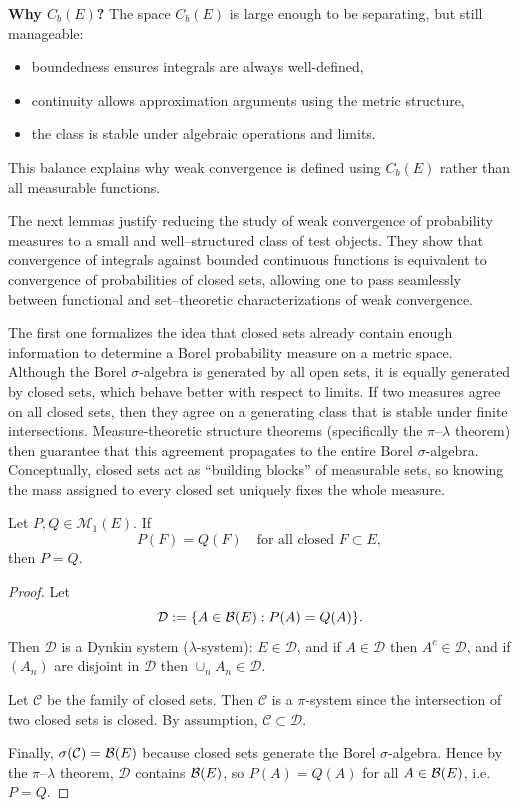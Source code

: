 \medskip

\noindent
\textbf{Why $C_b(E)$?}
The space $C_b(E)$ is large enough to be separating, but still manageable:
\begin{itemize}
\item boundedness ensures integrals are always well-defined,
\item continuity allows approximation arguments using the metric structure,
\item the class is stable under algebraic operations and limits.
\end{itemize}
This balance explains why weak convergence is defined using $C_b(E)$
rather than all measurable functions.

The next lemmas justify reducing the study of weak convergence of probability measures to a
small and well--structured class of test objects. They show that convergence of integrals
against bounded continuous functions is equivalent to convergence of probabilities of
closed sets, allowing one to pass seamlessly between functional and set--theoretic
characterizations of weak convergence.

The first one formalizes the idea that closed sets already contain enough information to determine a Borel probability measure on a metric space. 
Although the Borel $\sigma$-algebra is generated by all open sets, it is equally generated by closed sets, which behave better with respect to limits.
If two measures agree on all closed sets, then they agree on a generating class that is stable under finite intersections.
Measure-theoretic structure theorems (specifically the $\pi$--$\lambda$ theorem) then guarantee that this agreement propagates to the entire Borel $\sigma$-algebra.
Conceptually, closed sets act as ``building blocks'' of measurable sets, so knowing the mass assigned to every closed set uniquely fixes the whole measure.



\begin{lemma}
\label{lem:closed_det}
Let $P,Q\in\mathcal{M}_1(E)$. If
\[
P(F)=Q(F)\quad\text{for all closed }F\subset E,
\]
then $P=Q$.
\end{lemma}

\begin{proof}
Let
\[
\mathcal{D}:=\{A\in\mathcal{B}(E): P(A)=Q(A)\}.
\]
Then $\mathcal{D}$ is a Dynkin system ($\lambda$-system): $E\in\mathcal{D}$, and if $A\in\mathcal{D}$ then $A^c\in\mathcal{D}$, and if $(A_n)$ are disjoint in $\mathcal{D}$ then $\cup_n A_n\in\mathcal{D}$.

Let $\mathcal{C}$ be the family of closed sets. Then $\mathcal{C}$ is a $\pi$-system since the intersection of two closed sets is closed. By assumption, $\mathcal{C}\subset\mathcal{D}$.

Finally, $\sigma(\mathcal{C})=\mathcal{B}(E)$ because closed sets generate the Borel $\sigma$-algebra. Hence by the $\pi$--$\lambda$ theorem, $\mathcal{D}$ contains $\mathcal{B}(E)$, so $P(A)=Q(A)$ for all $A\in\mathcal{B}(E)$, i.e.\ $P=Q$.
\end{proof}

